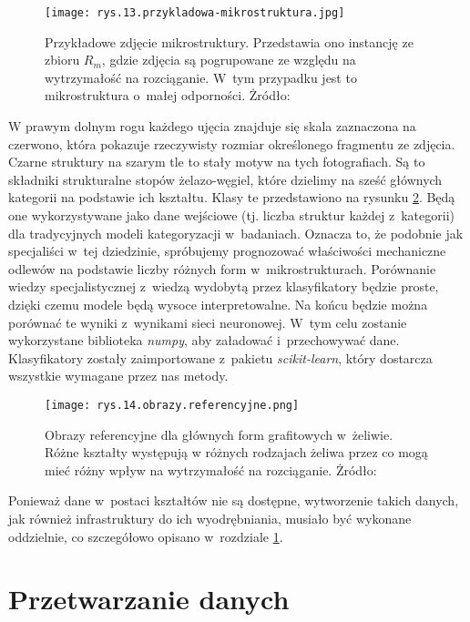 \begin{figure}[h]
    \centering
    \texttt{[image: rys.13.przykladowa-mikrostruktura.jpg]}
    \caption{Przykładowe zdjęcie mikrostruktury. Przedstawia ono instancję ze zbioru $R_m$, gdzie zdjęcia są pogrupowane ze względu na wytrzymałość na rozciąganie. W~tym przypadku jest to mikrostruktura o~małej odporności. Żródło: \cite{Pirowski17}}
    \label{fig:mesh13}
\end{figure}
W prawym dolnym rogu każdego ujęcia znajduje się skala zaznaczona na czerwono, która pokazuje rzeczywisty rozmiar określonego fragmentu ze zdjęcia. Czarne struktury na szarym tle to stały motyw na tych fotografiach. Są to składniki strukturalne stopów żelazo-węgiel, które dzielimy na sześć głównych kategorii na podstawie ich kształtu. Klasy te przedstawiono na rysunku \ref{fig:mesh14}. Będą one wykorzystywane jako dane wejściowe (tj. liczba struktur każdej z~kategorii) dla tradycyjnych modeli kategoryzacji w~badaniach. Oznacza to, że podobnie jak specjaliści w~tej dziedzinie, spróbujemy prognozować właściwości mechaniczne odlewów na podstawie liczby różnych form w~mikrostrukturach. Porównanie wiedzy specjalistycznej z~wiedzą wydobytą przez klasyfikatory będzie proste, dzięki czemu modele będą wysoce interpretowalne. Na końcu będzie można porównać te wyniki z~wynikami sieci neuronowej. W~tym celu zostanie wykorzystane biblioteka \textit{numpy}, aby załadować i~przechowywać dane. Klasyfikatory zostały zaimportowane z~pakietu \textit{scikit-learn}, który dostarcza wszystkie wymagane przez nas metody. 
\begin{figure}[h]
    \centering
    \texttt{[image: rys.14.obrazy.referencyjne.png]}
    \caption{Obrazy referencyjne dla głównych form grafitowych w~żeliwie. Różne kształty występują w różnych rodzajach żeliwa przez co mogą mieć różny wpływ na wytrzymałość na rozciąganie. Żródło: \cite{norma}}
    \label{fig:mesh14}
\end{figure}
Ponieważ dane w~postaci kształtów nie są dostępne, wytworzenie takich danych, jak również infrastruktury do ich wyodrębniania, musiało być wykonane oddzielnie, co szczegółowo opisano w~rozdziale \ref{sec:przygotowanie_danych}.

\section{Przetwarzanie danych}
\label{sec:przygotowanie_danych}

